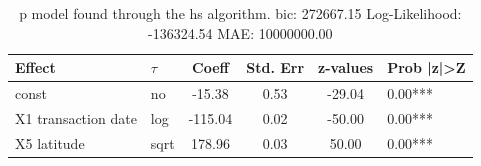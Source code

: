 \begin{table}
	\caption{p model found through the hs algorithm. bic: 272667.15 Log-Likelihood: -136324.54 MAE: 10000000.00}
	\begin{center}
		\begin{tabular}{|l|l|c|c|c|l|}
			\hline
			Effect & $\tau$ & Coeff & Std. Err & z-values & Prob |z|>Z \\
			\hline
			const & no & -15.38 & 0.53 & -29.04 & 0.00*** \\
			\hline
			X1 transaction date & log & -115.04 & 0.02 & -50.00 & 0.00*** \\
			\hline
			X5 latitude & sqrt & 178.96 & 0.03 & 50.00 & 0.00*** \\
			\hline
		\end{tabular}
	\end{center}
\end{table}
